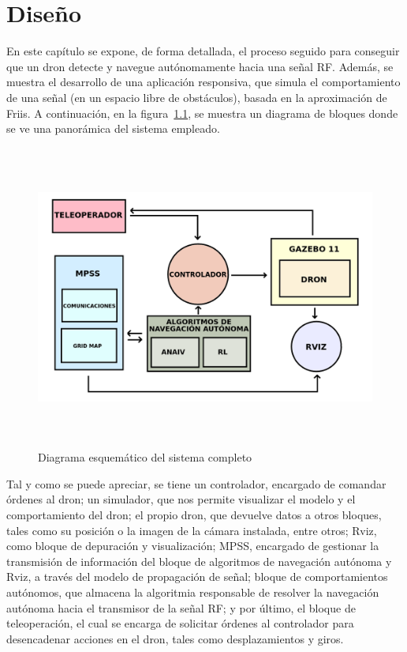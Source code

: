\chapter{Diseño}
\label{cap:capitulo4}

En este capítulo se expone, de forma detallada, el proceso seguido para conseguir que un dron detecte y navegue autónomamente hacia una señal \ac{RF}. Además, se muestra el desarrollo de una aplicación responsiva, que simula el comportamiento de una señal (en un espacio libre de obstáculos), basada en la aproximación de Friis. A continuación, en la figura~\ref{fig:diagrama}, se muestra un diagrama de bloques donde se ve una panorámica del sistema empleado.\\

\begin{figure} [t]
	\begin{center}
	\includegraphics[height=10cm]{imagenes/cap4/0_diagrama_general.png}
	\end{center}
	\caption[Diagrama esquemático del sistema completo]{Diagrama esquemático del sistema completo}
	\label{fig:diagrama}
\end{figure}

Tal y como se puede apreciar, se tiene un controlador, encargado de comandar órdenes al dron; un simulador, que nos permite visualizar el modelo y el comportamiento del dron; el propio dron, que devuelve datos a otros bloques, tales como su posición o la imagen de la cámara instalada, entre otros; Rviz, como bloque de depuración y visualización; \ac{MPSS}, encargado de gestionar la transmisión de información del bloque de algoritmos de navegación autónoma y Rviz, a través del modelo de propagación de señal; bloque de comportamientos autónomos, que almacena la algoritmia responsable de resolver la navegación autónoma hacia el transmisor de la señal \ac{RF}; y por último, el bloque de teleoperación, el cual se encarga de solicitar órdenes al controlador para desencadenar acciones en el dron, tales como desplazamientos y giros.

